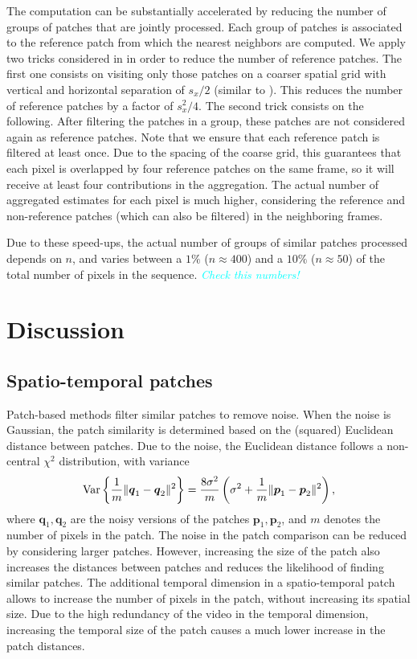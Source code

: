\documentclass[10pt, journal, twocolumn, final, a4paper]{IEEEtran}
\newcommand{\pa}[1]{\textcolor{cyan}{#1}}
\newcommand{\pcomment}[1]{\textit{\pa{#1}}}
\newcommand{\ma}[1]{\boldsymbol{#1}}
\begin{document}
The computation can be substantially accelerated by reducing the 
number of groups of patches that are jointly processed.
Each group of patches is associated to the reference patch from which 
the nearest neighbors are computed.
We apply two tricks
considered in \cite{Lebrun2013ipol} in order to reduce the number of reference patches. 
The first one consists on visiting only 
those patches on a coarser spatial grid with vertical and horizontal separation of $s_x/2$
(similar to \cite{Dabov2007tip}). This reduces the number of reference patches by a
factor of $s_x^2/4$. The second trick consists on the following.  After
filtering the patches in a group, these patches are not considered again
as reference patches. 
Note that we ensure that each reference patch is filtered at least once. 
Due to the spacing of the coarse grid, this guarantees that each pixel is
overlapped by four reference patches on the same frame, so it will receive at
least four contributions in the aggregation. The actual number of aggregated
estimates for each pixel is much higher, considering the reference and
non-reference patches (which can also be filtered) in the neighboring frames.

Due to these speed-ups, the actual number of groups of similar patches processed
depends on $n$, and varies between a $1\%$ ($n \approx 400$)  and a $10\%$ ($n
\approx 50$) of the total number of pixels in the sequence. 
\pcomment{Check this numbers!}


\section{Discussion}
\label{sec:discussion}

\subsection{Spatio-temporal patches}
\label{sse:spatio-temporal-patches}
Patch-based methods filter similar patches to remove noise. When the noise is
Gaussian, the patch similarity is determined based on the (squared) Euclidean distance 
between patches. Due to the noise, the Euclidean distance follows a non-central
$\chi^2$ distribution, with variance
\[\textnormal{Var}\left\{\frac1{m}\|\ma q_1 - \ma q_2\|^2\right\} = \frac{8\sigma^2}{m}\left(\sigma^2 + \frac1{m}\|\ma p_1 - \ma p_2\|^2\right),\]
where $\ma q_1, \ma q_2$ are the noisy versions of the patches $\ma p_1, \ma p_2$, 
and $m$ denotes the number of pixels in the patch. The noise in the patch comparison
can be reduced by considering larger patches.
However, increasing the size of the patch also increases the distances between
patches and reduces the likelihood of finding similar patches.
%
The additional temporal dimension in a spatio-temporal patch allows to increase
the number of pixels in the patch, without increasing its spatial size.
Due to the high redundancy of the video in the temporal dimension, increasing the 
temporal size of the patch causes a much lower increase in the patch distances.
%
\end{document}
